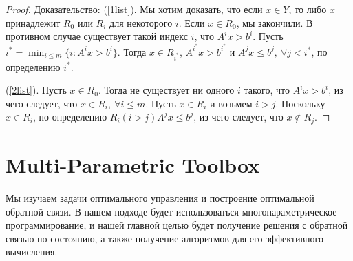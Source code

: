 \begin{proof}
    Доказательство: 
    (\ref{1list}). Мы хотим доказать, что если $x \in Y$, то либо $x$ принадлежит $R_0$ или $R_i$ для некоторого $i$. Если $x \in R_0$, мы закончили. В противном случае существует такой индекс $i$, что $A^{i} x > b^i$. Пусть $i^* = \min_{i \leq m} \{ i: A^{i}x > b^{i} \}$. Тогда $x \in R_{i^*}$, $A^{i^{*}} x > b^{i^{*}}$ и $A^{j} x \leq b^{j},\ \forall j < i^*$, по определению $i^*$.
    
    (\ref{2list}). Пусть $x \in R_0.$ Тогда не существует ни одного $i$ такого, что $A^{i} x > b^i$, из чего следует, что $x \in R_i,\  \forall i \leq m$. Пусть $x \in R_i$ и возьмем $i > j$. Поскольку $x \in R_i$, по определению $R_{i} (i > j) A^{j}x \leq b^j$, из чего следует, что $x \not \in R_j$.    
\end{proof}






\section{Multi-Parametric Toolbox}\label{2sec:problem-formulation}

Мы изучаем задачи оптимального управления и построение оптимальной обратной связи. В нашем подходе будет использоваться многопараметрическое программирование, и нашей главной целью будет получение решения с обратной связью по состоянию, а также получение алгоритмов для его эффективного вычисления.

